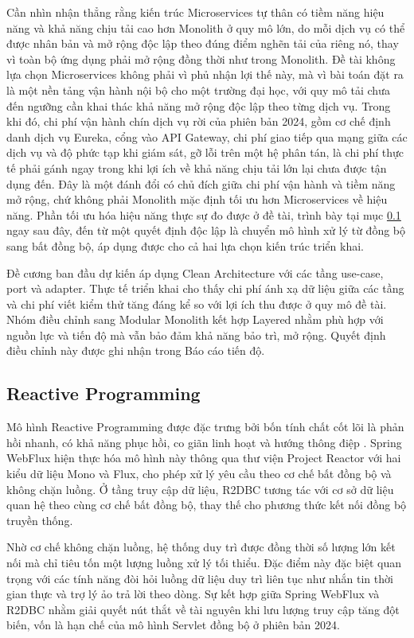 \documentclass[12pt,a4paper,oneside]{report}
\begin{document}
Cần nhìn nhận thẳng rằng kiến trúc Microservices tự thân có tiềm năng hiệu năng và khả năng chịu tải cao hơn Monolith ở quy mô lớn, do mỗi dịch vụ có thể được nhân bản và mở rộng độc lập theo đúng điểm nghẽn tải của riêng nó, thay vì toàn bộ ứng dụng phải mở rộng đồng thời như trong Monolith. Đề tài không lựa chọn Microservices không phải vì phủ nhận lợi thế này, mà vì bài toán đặt ra là một nền tảng vận hành nội bộ cho một trường đại học, với quy mô tải chưa đến ngưỡng cần khai thác khả năng mở rộng độc lập theo từng dịch vụ. Trong khi đó, chi phí vận hành chín dịch vụ rời của phiên bản 2024, gồm cơ chế định danh dịch vụ Eureka, cổng vào API Gateway, chi phí giao tiếp qua mạng giữa các dịch vụ và độ phức tạp khi giám sát, gỡ lỗi trên một hệ phân tán, là chi phí thực tế phải gánh ngay trong khi lợi ích về khả năng chịu tải lớn lại chưa được tận dụng đến. Đây là một đánh đổi có chủ đích giữa chi phí vận hành và tiềm năng mở rộng, chứ không phải Monolith mặc định tối ưu hơn Microservices về hiệu năng. Phần tối ưu hóa hiệu năng thực sự đo được ở đề tài, trình bày tại mục \ref{subsec:reactive} ngay sau đây, đến từ một quyết định độc lập là chuyển mô hình xử lý từ đồng bộ sang bất đồng bộ, áp dụng được cho cả hai lựa chọn kiến trúc triển khai.

Đề cương ban đầu dự kiến áp dụng Clean Architecture \cite{clean} với các tầng use-case, port và adapter. Thực tế triển khai cho thấy chi phí ánh xạ dữ liệu giữa các tầng và chi phí viết kiểm thử tăng đáng kể so với lợi ích thu được ở quy mô đề tài. Nhóm điều chỉnh sang Modular Monolith kết hợp Layered nhằm phù hợp với nguồn lực và tiến độ mà vẫn bảo đảm khả năng bảo trì, mở rộng. Quyết định điều chỉnh này được ghi nhận trong Báo cáo tiến độ.

\subsection{Reactive Programming}
\label{subsec:reactive}

Mô hình Reactive Programming được đặc trưng bởi bốn tính chất cốt lõi là phản hồi nhanh, có khả năng phục hồi, co giãn linh hoạt và hướng thông điệp \cite{reactive}. Spring WebFlux hiện thực hóa mô hình này thông qua thư viện Project Reactor với hai kiểu dữ liệu Mono và Flux, cho phép xử lý yêu cầu theo cơ chế bất đồng bộ và không chặn luồng. Ở tầng truy cập dữ liệu, R2DBC tương tác với cơ sở dữ liệu quan hệ theo cùng cơ chế bất đồng bộ, thay thế cho phương thức kết nối đồng bộ truyền thống.

Nhờ cơ chế không chặn luồng, hệ thống duy trì được đồng thời số lượng lớn kết nối mà chỉ tiêu tốn một lượng luồng xử lý tối thiểu. Đặc điểm này đặc biệt quan trọng với các tính năng đòi hỏi luồng dữ liệu duy trì liên tục như nhắn tin thời gian thực và trợ lý ảo trả lời theo dòng. Sự kết hợp giữa Spring WebFlux và R2DBC nhằm giải quyết nút thắt về tài nguyên khi lưu lượng truy cập tăng đột biến, vốn là hạn chế của mô hình Servlet đồng bộ ở phiên bản 2024.
\end{document}
